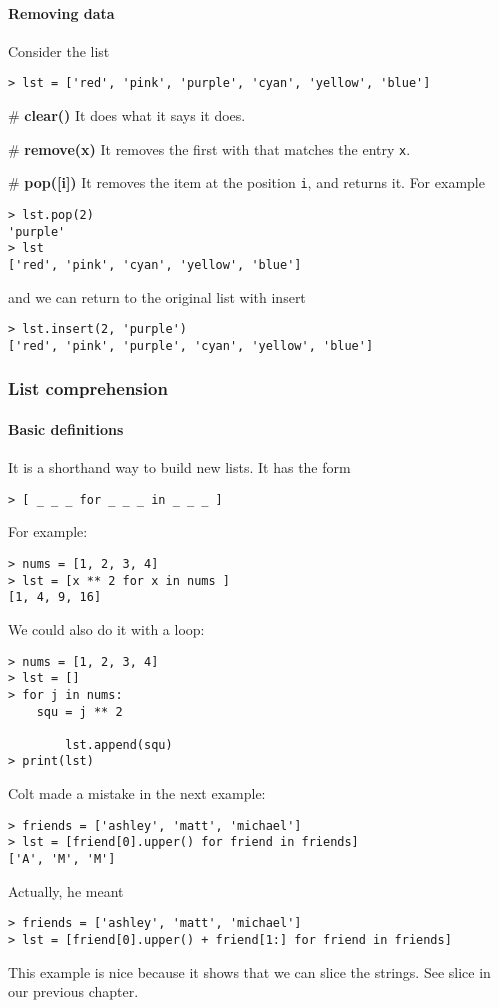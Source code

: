 \paragraph{Removing data}

Consider the list
\begin{verbatim}
> lst = ['red', 'pink', 'purple', 'cyan', 'yellow', 'blue']
\end{verbatim}

\# {\bf clear()} It does what it says it does.

\# {\bf remove(x)} It removes the first with that matches the entry \verb|x|.

\# {\bf pop([i])} It removes the item at the position \verb|i|, and returns it. For example
\begin{verbatim}
> lst.pop(2)
'purple'
> lst 
['red', 'pink', 'cyan', 'yellow', 'blue']
\end{verbatim}
and we can return to the original list with insert 
\begin{verbatim}
> lst.insert(2, 'purple')
['red', 'pink', 'purple', 'cyan', 'yellow', 'blue']
\end{verbatim}


\subsubsection{List comprehension}

\paragraph{Basic definitions}

It is a shorthand way to build new lists. It has the form
\begin{verbatim}
> [ _ _ _ for _ _ _ in _ _ _ ]
\end{verbatim}
For example:
\begin{verbatim}
> nums = [1, 2, 3, 4]
> lst = [x ** 2 for x in nums ]
[1, 4, 9, 16]
\end{verbatim}

We could also do it with a loop:
\begin{verbatim}
> nums = [1, 2, 3, 4]
> lst = []
> for j in nums:
   	squ = j ** 2

        lst.append(squ)
> print(lst)
\end{verbatim}

Colt made a mistake in the next example:

\begin{verbatim}
> friends = ['ashley', 'matt', 'michael']
> lst = [friend[0].upper() for friend in friends]
['A', 'M', 'M']
\end{verbatim}
Actually, he meant
\begin{verbatim}
> friends = ['ashley', 'matt', 'michael']
> lst = [friend[0].upper() + friend[1:] for friend in friends]
\end{verbatim}
This example is nice because it shows that we can slice the strings. See slice in our previous chapter. 

